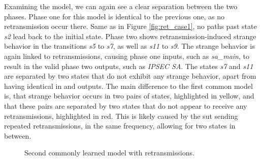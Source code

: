 Examining the model, we can again see a clear separation between the two phases. Phase one for this model is identical to the previous one, as no retransmission occur there. Same as in Figure \ref{fig:ret_case1}, no paths past state \emph{s2} lead back to the initial state. Phase two shows retransmission-induced strange behavior in the transitions \emph{s5} to \emph{s7}, as well as \emph{s11} to \emph{s9}. The strange behavior is again linked to retransmissions, causing phase one inputs, such as \emph{sa\_main}, to result in the valid phase two outputs, such as \emph{IPSEC SA}. The states \emph{s7} and \emph{s11} are separated by two states that do not exhibit any strange behavior, apart from having identical in and outputs. The main difference to the first common model is, that strange behavior occurs in two pairs of states, highlighted in yellow, and that these pairs are separated by two states that do not appear to receive any retransmissions, highlighted in red. This is likely caused by the \ac{sut} sending repeated retransmissions, in the same frequency, allowing for two states in between. 

\begin{figure}[ht]
	\vspace*{\fill}
	\noindent
	\hspace*{-5.5\oddsidemargin}%
	\caption{Second commonly learned model with retransmissions.}
	\label{fig:ret_case2}
	\vspace*{\fill}
\end{figure}
\newpage

